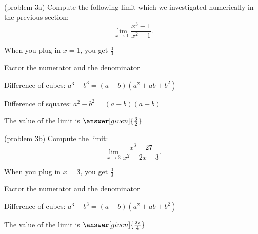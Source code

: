 \documentclass{ximera}
\begin{document}
\begin{problem}(problem 3a)
  Compute the following limit which we investigated numerically in the previous section:
  \[
  \lim_{x \to 1} \frac{x^3 - 1}{x^2 -1}.
  \]
  
    \begin{hint}
      When you plug in $x = 1$, you get $\frac00$
    \end{hint}
    \begin{hint}
      Factor the numerator and the denominator
    \end{hint}
    \begin{hint}
      Difference of cubes: $a^3 - b^3 = (a-b)(a^2 + ab +b^2)$
    \end{hint}
		\begin{hint}
      Difference of squares: $a^2 - b^2 = (a-b)(a+b)$
    \end{hint}

		The value of the limit is
		 $\answer[given]{\frac32}$
		
\end{problem}


\begin{problem}(problem 3b)
  Compute the limit:
  \[
  \lim_{x \to 3} \frac{x^3 - 27}{x^2 -2x - 3}.
  \]
  
    \begin{hint}
      When you plug in $x = 3$, you get $\frac00$
    \end{hint}
    \begin{hint}
      Factor the numerator and the denominator
    \end{hint}
    \begin{hint}
      Difference of cubes: $a^3 - b^3 = (a-b)(a^2 + ab +b^2)$
    \end{hint}

		The value of the limit is
		 $\answer[given]{\frac{27}{4}}$
		
\end{problem}
\end{document}

